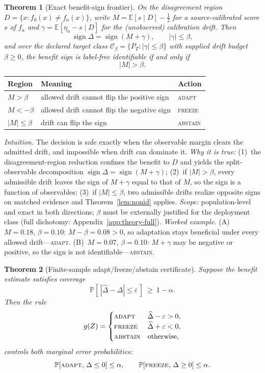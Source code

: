 \documentclass[conference]{IEEEtran}
\theoremstyle{plain}
\newtheorem{theorem}{Theorem}
\theoremstyle{definition}
\theoremstyle{remark}
\newcommand{\E}{\mathbb{E}}
\renewcommand{\Pr}{\mathbb{P}}
\newcommand{\sign}{\operatorname{sign}}
\begin{document}
\begin{theorem}[Exact benefit-sign frontier]\label{thm:headline}
On the disagreement region $D=\{x:f_0(x)\neq f_a(x)\}$, write $M=\E[s\mid D]-\tfrac12$ for a
source-calibrated score $s$ of $f_a$ and $\gamma=\E[\eta_a-s\mid D]$ for the \emph{(unobserved)}
calibration drift. Then
\[
\sign\Delta=\sign(M+\gamma),\qquad |\gamma|\le\beta,
\]
and over the declared target class $\mathcal C_\beta=\{P_T:|\gamma|\le\beta\}$ with supplied
drift budget $\beta\ge0$, the benefit sign is label-free identifiable \emph{if and only if}
\[
|M|>\beta .
\]
\end{theorem}

\begin{center}\footnotesize
\begin{tabular}{@{}lll@{}}
\toprule
Region & Meaning & Action \\
\midrule
$M>\beta$ & allowed drift cannot flip the positive sign & \textsc{adapt} \\
$M<-\beta$ & allowed drift cannot flip the negative sign & \textsc{freeze} \\
$|M|\le\beta$ & drift can flip the sign & \textsc{abstain} \\
\bottomrule
\end{tabular}
\end{center}

\noindent\emph{Intuition.} The decision is safe exactly when the observable margin clears the
admitted drift, and impossible when drift can dominate it. \emph{Why it is true:} (1)~the
disagreement-region reduction confines the benefit to $D$ and yields the split-observable
decomposition $\sign\Delta=\sign(M+\gamma)$; (2)~if $|M|>\beta$, every admissible drift leaves
the sign of $M+\gamma$ equal to that of $M$, so the sign is a function of observables; (3)~if
$|M|\le\beta$, two admissible drifts realize opposite signs on matched evidence and
Theorem~\ref{lem:nonid} applies. \emph{Scope:} population-level and exact in both directions;
$\beta$ must be externally justified for the deployment class (full dichotomy:
Appendix~\ref{app:theory-full}). \emph{Worked example.} (A)~$M{=}0.18$, $\beta{=}0.10$:
$M-\beta=0.08>0$, so adaptation stays beneficial under every allowed drift---\textsc{adapt}.
(B)~$M{=}0.07$, $\beta{=}0.10$: $M+\gamma$ may be negative or positive, so the sign is not
identifiable---\textsc{abstain}.

\begin{theorem}[Finite-sample adapt/freeze/abstain certificate]\label{thm:certificate}
Suppose the benefit estimate satisfies coverage
\[
\Pr\!\left[\,|\widehat\Delta-\Delta|\le\varepsilon\,\right]\ \ge\ 1-\alpha .
\]
Then the rule
\[
g(Z)=\begin{cases}
\textsc{adapt} & \widehat\Delta-\varepsilon>0,\\
\textsc{freeze} & \widehat\Delta+\varepsilon<0,\\
\textsc{abstain} & \text{otherwise},
\end{cases}
\]
controls both marginal error probabilities:
\[
\Pr[\textsc{adapt},\,\Delta\le0]\le\alpha,
\qquad
\Pr[\textsc{freeze},\,\Delta\ge0]\le\alpha .
\]
\end{theorem}
\end{document}
